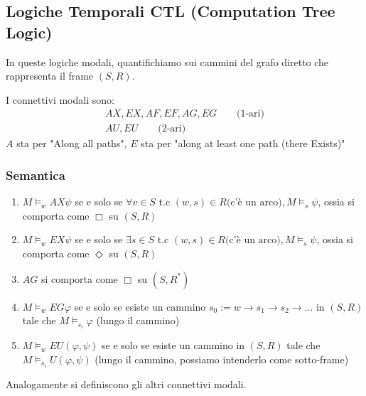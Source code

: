 \documentclass[../main.tex]{subfiles}
\begin{document}
\newpage

\subsection{Logiche Temporali CTL (Computation Tree Logic)}
In queste logiche modali, quantifichiamo sui cammini del grafo diretto che rappresenta il frame $(S,R)$.

I connettivi modali sono:
\begin{gather*}
    AX, EX, AF, EF, AG, EG \qquad \text{(1-ari)}\\
    AU, EU \qquad \text{(2-ari)}
\end{gather*}
$A$ sta per "Along all paths", $E$ sta per "along at least one path (there Exists)"
\subsubsection{Semantica}
\begin{enumerate}[label=\arabic*)]
    \item $M \vDash_w AX \psi $ se e solo se $\forall v \in S$ t.c $(w,s) \in R \text{(c'è un arco)} , M \vDash_s \psi$, ossia si comporta come $\Box$ su $(S,R)$
    \item $M \vDash_w EX \psi $ se e solo se $\exists s \in S$ t.c $(w,s) \in R \text{(c'è un arco)} , M \vDash_s \psi$, ossia si comporta come $\Diamond$ su $(S,R)$
    \item $AG$ si comporta come $\Box$ su $(S,R^*)$
    \item $M \vDash_w EG \varphi$ se e solo se esiste un cammino $s_0 := w \to s_1 \to s_2 \to \ldots $ in $(S,R)$ tale che $M \vDash_{s_i} \varphi$ (lungo il cammino)
    \item $M \vDash_w EU (\varphi, \psi)$ se e solo se esiste un cammino in $(S,R)$ tale che $M \vDash_{s_i} U(\varphi, \psi)$ (lungo il cammino, possiamo intenderlo come sotto-frame)
\end{enumerate}
Analogamente si definiscono gli altri connettivi modali.
\end{document}

